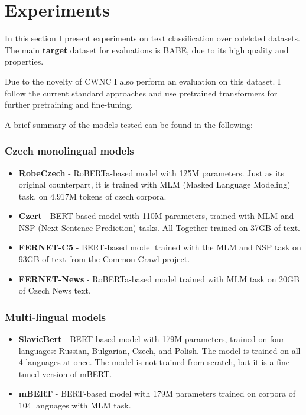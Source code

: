 \chapter{Experiments}\label{experiments}
In this section I present experiments on text classification over colelcted datasets. The main \textbf{target} dataset for evaluations is BABE, due to its high quality and properties.

Due to the novelty of CWNC I also perform an evaluation on this dataset.
I follow the current standard approaches and use pretrained transformers for further pretraining and fine-tuning. 

A brief summary of the models tested can be found in the following:




\subsection{Czech monolingual models}
\begin{itemize}
    \item \textbf{RobeCzech} \cite{strakarobeczech} - RoBERTa-based model with 125M parameters. Just as its original counterpart, it is trained with MLM (Masked Language Modeling) task, on 4,917M tokens of czech corpora.
    \item \textbf{Czert} \cite{sido-etal-2021-czert} - BERT-based model with 110M parameters, trained with MLM and NSP (Next Sentence Prediction) tasks. All Together trained on 37GB of text. 
    \item \textbf{FERNET-C5} \cite{lehevcka2021comparison} - BERT-based model trained with the MLM and NSP task on 93GB of text from the Common Crawl project.
    \item \textbf{FERNET-News} \cite{lehevcka2021comparison} - RoBERTa-based model trained with MLM task on 20GB of Czech News text.
\end{itemize}






\subsection{Multi-lingual models}
\begin{itemize}
    \item \textbf{SlavicBert} \cite{arkhipov2019tuning} - BERT-based model with 179M parameters, trained on four languages: Russian, Bulgarian, Czech, and Polish. The model is trained on all 4 languages at once. The model is not trained from scratch, but it is a fine-tuned version of mBERT.
    \item \textbf{mBERT} - BERT-based model with 179M parameters trained on corpora of 104 languages with MLM task.
\end{itemize}


